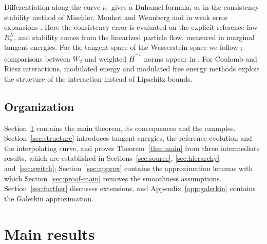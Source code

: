 \documentclass[11pt]{amsart}
\numberwithin{equation}{section}
\theoremstyle{plain}
\theoremstyle{remark}
\newcommand{\W}{W_2}
\begin{document}
Differentiation along the curve $\nu_s$ gives a Duhamel formula, as in the consistency--stability method of Mischler, Mouhot and Wennberg \cite{MMW15} and in weak error expansions \cite{CST22,DT25}. Here the consistency error is evaluated on the explicit reference law $R^N_s$, and stability comes from the linearized particle flow, measured in marginal tangent energies. For the tangent space of the Wasserstein space we follow \cite{Ott01,AGS08}; comparisons between $\W$ and weighted $\dot H^{-1}$ norms appear in \cite{Loe06,Pey18}. For Coulomb and Riesz interactions, modulated energy and modulated free energy methods \cite{Due16,Ser20,NRS22,BJW23,RS26,CRS25} exploit the structure of the interaction instead of Lipschitz bounds.

\subsection{Organization}
Section~\ref{sec:main} contains the main theorem, its consequences and the examples. Section~\ref{sec:structure} introduces tangent energies, the reference evolution and the interpolating curve, and proves Theorem~\ref{thm:main} from three intermediate results, which are established in Sections~\ref{sec:source}, \ref{sec:hierarchy} and~\ref{sec:switch}; Section~\ref{sec:approx} contains the approximation lemmas with which Section~\ref{sec:proof-main} removes the smoothness assumptions. Section~\ref{sec:further} discusses extensions, and Appendix~\ref{app:galerkin} contains the Galerkin approximation.

\section{Main results}\label{sec:main}
\end{document}
